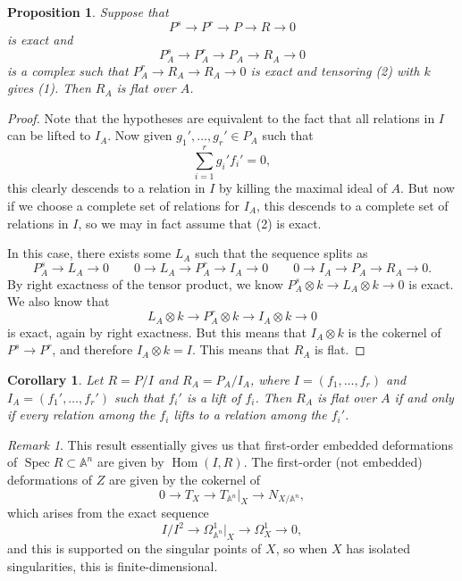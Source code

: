\documentclass{amsart}
\newtheorem{cor}[thm]{Corollary}
\newtheorem{prop}[thm]{Proposition}
\theoremstyle{definition}
\theoremstyle{remark}
\newtheorem{rmk}[thm]{Remark}
\theoremstyle{plain}
\theoremstyle{definition}
\theoremstyle{remark}
\newcommand{\A}{\mathbb{A}}
\newcommand{\1}{\mathbf{1}}
\newcommand{\2}{\mathbf{2}}
\newcommand{\3}{\mathbf{3}}
\DeclareMathOperator{\Hom}{Hom}
\DeclareMathOperator{\Spec}{Spec}
\begin{document}
\begin{prop}
    Suppose that 
    \begin{equation} P^s \to P^r \to P \to R \to 0 \end{equation}
    is exact and
    \begin{equation} P_A^s \to P_A^r \to P_A \to R_A \to 0 \end{equation}
    is a complex such that $P_A^r \to R_A \to R_A \to 0$ is exact and tensoring (2) with $k$ gives (1). Then $R_A$ is flat over $A$.
\end{prop}

\begin{proof}
    Note that the hypotheses are equivalent to the fact that all relations in $I$ can be lifted to $I_A$. Now given $g_1', \ldots, g_r' \in P_A$ such that 
    \[ \sum_{i=1}^r g_i' f_i' = 0, \]
    this clearly descends to a relation in $I$ by killing the maximal ideal of $A$. But now if we choose a complete set of relations for $I_A$, this descends to a complete set of relations in $I$, so we may in fact assume that (2) is exact.

    In this case, there exists some $L_A$ such that the sequence splits as
    \[ P_A^s \to L_A \to 0 \qquad 0 \to L_A \to P_A^r \to I_A \to 0 \qquad 0 \to I_A \to P_A \to R_A \to 0. \]
    By right exactness of the tensor product, we know $P_A^{s} \otimes k \to L_A \otimes k \to 0$ is exact. We also know that
    \[ L_A \otimes k \to P_A^r \otimes k \to I_A \otimes k \to 0 \]
    is exact, again by right exactness. But this means that $I_A \otimes k$ is the cokernel of $P^s \to P^r$, and therefore $I_A \otimes k = I$. This means that $R_A$ is flat.
\end{proof}

\begin{cor}
    Let $R = P/I$ and $R_A = P_A / I_A$, where $I = (f_1, \ldots, f_r)$ and $I_A = (f_1', \ldots, f_r')$ such that $f_i'$ is a lift of $f_i$. Then $R_A$ is flat over $A$ if and only if every relation among the $f_i$ lifts to a relation among the $f_i'$.
\end{cor}

\begin{rmk}
    This result essentially gives us that first-order embedded deformations of $\Spec R \subset \A^n$ are given by $\Hom(I, R)$. The first-order (not embedded) deformations of $Z$ are given by the cokernel of
    \[ 0 \to T_X \to T_{\A^n}|_X \to N_{X/\A^n}, \]
    which arises from the exact sequence
    \[ I/I^2 \to \Omega^1_{\A^n}|_X \to \Omega^1_X \to 0, \]
    and this is supported on the singular points of $X$, so when $X$ has isolated singularities, this is finite-dimensional.
\end{rmk}
\end{document}
